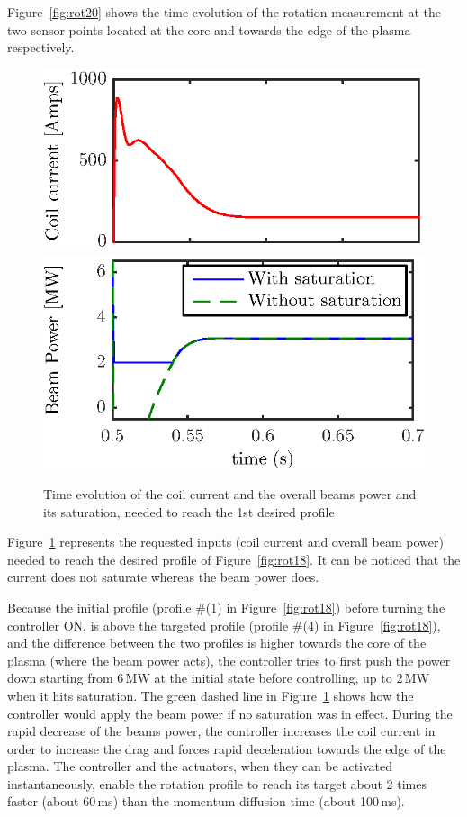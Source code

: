 \documentclass{iopart}
\begin{document}
Figure~\ref{fig:rot20} shows the time evolution of the rotation measurement at the two sensor points located at the core and towards the edge of the plasma respectively.  



\begin{figure}
	\centering
	\includegraphics{imene_figs/fig15a}  %
	\includegraphics{imene_figs/fig15b} 
	\caption{Time evolution of the coil current and the overall beams power and its saturation, needed to reach the 1st desired profile }
	\label{fig:rot19}
\end{figure} 

Figure~\ref{fig:rot19} represents the requested inputs (coil current and overall beam power) needed to reach the desired profile of Figure~\ref{fig:rot18}. It can be noticed that the current does not saturate whereas the beam power does.

Because the initial profile (profile \#(1) in Figure~\ref{fig:rot18}) before turning the controller ON, is above the targeted profile  (profile \#(4) in Figure~\ref{fig:rot18}), and the difference between the two profiles is higher towards the core of the plasma (where the beam power acts), the controller tries to first push the power down starting from $6$\,MW at the initial state before controlling, up to $2$\,MW when it hits saturation. The green dashed line in Figure~\ref{fig:rot19} shows how the controller would apply the beam power if no saturation was in effect. During the rapid decrease of the beams power, the controller increases the coil current in order to increase the drag and forces rapid deceleration towards the edge of the plasma.  
The controller and the actuators, when they can be activated instantaneously, enable the rotation profile to reach its target about 2 times faster (about 60\,ms) than the momentum diffusion time (about 100\,ms).
\end{document}
